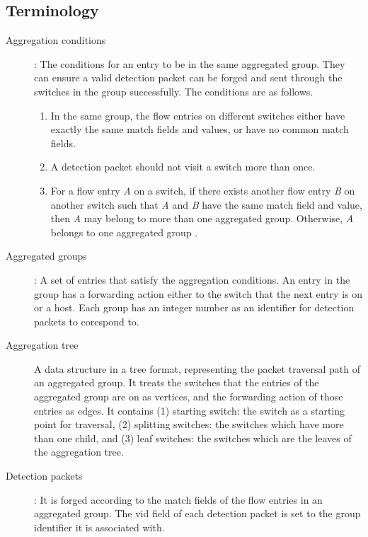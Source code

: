 \subsection{Terminology}

\begin{description}%

\item
[Aggregation conditions]:
The conditions for an entry to be in the same aggregated group. They can ensure a valid detection packet can be forged and sent through the switches in the group successfully. The conditions are as follows.
\begin{enumerate}[label={\arabic*)}]
\item
In the same group, the flow entries on different switches either have exactly the same match fields and values, or have no common match fields.
\item
A detection packet should not visit a switch more than once.
\item
For a flow entry \textit{A} on a switch, if there exists another flow entry \textit{B} on another switch such that \textit{A} and \textit{B} have the same match field and value, then \textit{A} may belong to more than one aggregated group. Otherwise, \textit{A} \sout{} belongs to one aggregated group \sout{}.

\end{enumerate}

\item
[Aggregated groups]: 
A set of entries that satisfy the aggregation conditions. An entry in the group has a forwarding action either to the switch that the next entry \sout{} is on or a host. Each group has an integer number as an identifier for detection packets to corespond to.

\item 
[Aggregation tree]
A data structure in a tree format, representing the packet traversal path of an aggregated group. It treats the switches that the entries of the aggregated group are on as vertices, and the forwarding action of those entries as edges. It contains (1) starting switch: the switch as a starting point for traversal, (2) splitting switches: the switches which have more than one child, and (3) leaf switches: the switches which are the leaves of the aggregation tree.

\item
[Detection packets]:
It is forged according to the match fields of the flow entries in an aggregated group. The vid field of each detection packet is set to the group identifier it is associated with.


\end{description}
